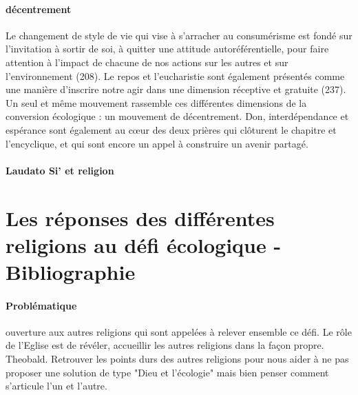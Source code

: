  \paragraph{décentrement}
 \begin{singlequote}
   Le changement de style de vie qui vise à s'arracher au consumérisme est fondé sur l'invitation à sortir de soi, à quitter une attitude autoréférentielle, pour faire attention à l'impact de chacune de nos actions sur les autres et sur l'environnement (208).   Le repos et l'eucharistie sont également présentés comme une manière d'inscrire notre agir dans une dimension réceptive et gratuite (237). Un seul et même mouvement rassemble ces différentes dimensions de la conversion écologique : un mouvement de décentrement.   Don, interdépendance et espérance sont également au cœur des deux prières qui clôturent le chapitre et l'encyclique, et qui sont encore un appel à construire un avenir partagé.   \cite[p. 191]{francois_loue_2020}  
 \end{singlequote}


\paragraph{Laudato Si’ et religion} \cite{powell_laudato_2017}    \cite{pisani_ecologie_2016}
 

   
  
  
\section{Les réponses des différentes religions au défi écologique - Bibliographie}
\paragraph{Problématique} ouverture aux autres religions qui sont appelées à relever ensemble ce défi. Le rôle de l'Eglise est de révéler, accueillir les autres religions dans la façon propre. Theobald. Retrouver les points durs des autres religions pour nous aider à ne pas proposer une solution de type "Dieu et l'écologie" mais bien penser comment s'articule l'un et l'autre.  


